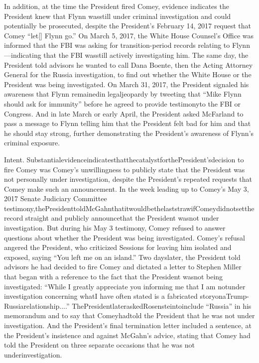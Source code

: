 {In addition, at the time the President fired Comey, evidence indicates the President knew that Flynn wasstill under criminal investigation and could potentially be prosecuted, despite the President’s February 14, 2017 request that Comey “let[] Flynn go.”
On March 5, 2017, the White House Counsel’s Office was informed that the FBI was asking for transition-period records relating to Flynn—indicating that the FBI wasstill actively investigating him.
The same day, the President told advisors he wanted to call Dana Boente, then the Acting Attorney General for the Russia investigation, to find out whether the White House or the President was being investigated.
On March 31, 2017, the President signaled his awareness that Flynn remainedin legaljeopardy by tweeting that “Mike Flynn should ask for immunity” before he agreed to provide testimonyto the FBI or Congress.
And in late March or early April, the President asked McFarland to pass a message to Flynn telling him that the President felt bad for him and that he should stay strong, further demonstrating the President’s awareness of Flynn’s criminal exposure.

Intent.
SubstantialevidenceindicatesthatthecatalystforthePresident’sdecision to fire Comey was Comey’s unwillingness to publicly state that the President was not personally under investigation, despite the President’s repeated requests that Comey make such an announcement.
In the week leading up to Comey’s May 3, 2017 Senate Judiciary Committee testimony,thePresidenttoldMcGahnthatitwouldbethelaststrawifComeydidnotsettherecord straight and publicly announcethat the President wasnot under investigation.
But during his May 3 testimony, Comey refused to answer questions about whether the President was being investigated.
Comey’s refusal angered the President, who criticized Sessions for leaving him isolated and exposed, saying “You left me on an island.”
Two dayslater, the President told advisors he had decided to fire Comey and dictated a letter to Stephen Miller that began with a reference to the fact that the President wasnot being investigated: “While I greatly appreciate you
informing me that I am notunder investigation concerning whatI have often stated is a fabricated storyonaTrump-Russiarelationship....”
ThePresidentlateraskedRosensteintoinclude “Russia” in his memorandum and to say that Comeyhadtold the President that he was not under investigation.
And the President’s final termination letter included a sentence, at the President’s insistence and against McGahn’s advice, stating that Comey had told the President on three separate occasions that he was not underinvestigation.

}

